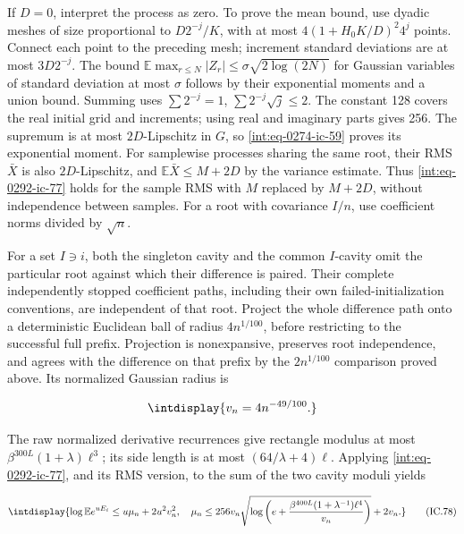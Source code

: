 
If \(D=0\), interpret the process as zero. To prove the mean bound, use dyadic meshes of size proportional to \(D2^{-j}/K\), with at most \(4(1+H_0K/D)^2 4^j\) points. Connect each point to the preceding mesh; increment standard deviations are at most \(3D2^{-j}\). The bound \(\mathbb E\max_{r\le N}|Z_r|\le\sigma\sqrt{2\log(2N)}\) for Gaussian variables of standard deviation at most \(\sigma\) follows by their exponential moments and a union bound. Summing uses \(\sum2^{-j}=1\), \(\sum2^{-j}\sqrt j\le2\). The constant 128 covers the real initial grid and increments; using real and imaginary parts gives 256. The supremum is at most \(2D\)-Lipschitz in \(G\), so \eqref{int:eq-0274-ic-59} proves its exponential moment. For samplewise processes sharing the same root, their RMS \(\bar X\) is also \(2D\)-Lipschitz, and \(\mathbb E\bar X\le M+2D\) by the variance estimate. Thus \eqref{int:eq-0292-ic-77} holds for the sample RMS with \(M\) replaced by \(M+2D\), without independence between samples. For a root with covariance \(I/n\), use coefficient norms divided by \(\sqrt n\).



For a set \(I\ni i\), both the singleton cavity and the common \(I\)-cavity omit the particular root against which their difference is paired. Their complete independently stopped coefficient paths, including their own failed-initialization conventions, are independent of that root. Project the whole difference path onto a deterministic Euclidean ball of radius \(4n^{1/100}\), before restricting to the successful full prefix. Projection is nonexpansive, preserves root independence, and agrees with the difference on that prefix by the \(2n^{1/100}\) comparison proved above. Its normalized Gaussian radius is


\begingroup\renewcommand{\theHequation}{intdisplay.673}
\begin{equation*}
\intdisplay{
v_n=4n^{-49/100}.
}
\end{equation*}
\endgroup


The raw normalized derivative recurrences give rectangle modulus at most \(\beta^{300L}(1+\lambda)\ell^3\); its side length is at most \((64/\lambda+4)\ell\). Applying \eqref{int:eq-0292-ic-77}, and its RMS version, to the sum of the two cavity moduli yields


\begingroup\renewcommand{\theHequation}{intdisplay.674}
\begin{equation}
\intdisplay{
\log\mathbb E e^{uE_i}\le u\mu_n+2u^2v_n^2,
 \quad\mu_n\le256v_n\sqrt{\log\left(e+
 \frac{\beta^{400L}(1+\lambda^{-1})\ell^4}{v_n}\right)}+2v_n.
}
\tag{IC.78}
\label{int:eq-0293-ic-78}
\end{equation}
\endgroup

